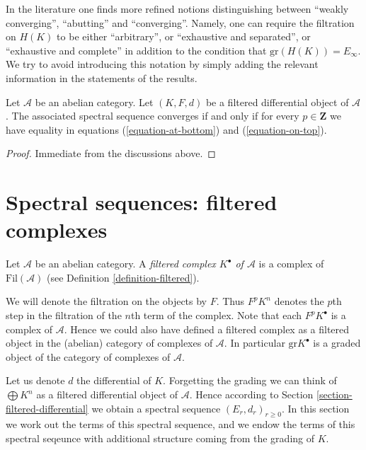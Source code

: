 \noindent
In the literature one finds more refined notions distinguishing between
``weakly converging'', ``abutting'' and ``converging''. Namely, one can
require the filtration on $H(K)$ to be either ``arbitrary'', or
``exhaustive and separated'', or ``exhaustive and complete'' in addition
to the condition that $\text{gr}(H(K)) = E_\infty$. We try to avoid introducing
this notation by simply adding the relevant information in the statements
of the results.

\begin{lemma}
\label{lemma-filtered-differential-ss-converges}
Let $\mathcal{A}$ be an abelian category.
Let $(K, F, d)$ be a filtered differential object of $\mathcal{A}$.
The associated spectral sequence converges if and only if for every
$p \in \mathbf{Z}$ we have equality in equations
(\ref{equation-at-bottom}) and (\ref{equation-on-top}).
\end{lemma}

\begin{proof}
Immediate from the discussions above.
\end{proof}














\section{Spectral sequences: filtered complexes}
\label{section-filtered-complex}

\begin{definition}
\label{definition-filtered-complex}
Let $\mathcal{A}$ be an abelian category.
A {\it filtered complex $K^\bullet$ of $\mathcal{A}$}
is a complex of $\text{Fil}(\mathcal{A})$ (see
Definition \ref{definition-filtered}).
\end{definition}

\noindent
We will denote the filtration on the objects by $F$. Thus
$F^pK^n$ denotes the $p$th step in the filtration of the $n$th term of the
complex. Note that each $F^pK^\bullet$ is a complex of $\mathcal{A}$.
Hence we could also have defined a filtered complex as a filtered object
in the (abelian) category of complexes of $\mathcal{A}$.
In particular $\text{gr} K^\bullet$ is a graded object of the
category of complexes of $\mathcal{A}$.

\medskip\noindent
Let us denote $d$ the differential of $K$. Forgetting the grading
we can think of $\bigoplus K^n$ as a filtered differential object of
$\mathcal{A}$. Hence according to Section \ref{section-filtered-differential}
we obtain a spectral sequence $(E_r, d_r)_{r \geq 0}$.
In this section we work out the terms
of this spectral sequence, and we endow the terms of this spectral seqeunce
with additional structure coming from the grading of $K$.

